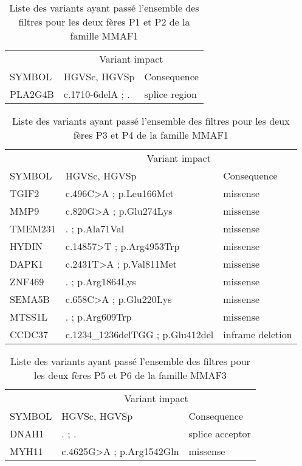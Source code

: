 \documentclass[12pt,twoside]{reedthesis}
\theoremstyle{definition}
\theoremstyle{definition}
\theoremstyle{remark}
\begin{document}
  \begin{longtable}[t]{lll}
  \caption{\label{tab:tabmmaf1}Liste des variants ayant passé l'ensemble des filtres pour les deux fères P1 et P2 de la famille MMAF1}\\
  \toprule
  \multicolumn{1}{c}{ } & \multicolumn{2}{c}{Variant impact} \\
  \cmidrule(l{2pt}r{2pt}){2-3}
  SYMBOL & HGVSc, HGVSp & Consequence\\
  \midrule
  PLA2G4B & c.1710-6delA ; . & splice region\\
  \bottomrule
  \end{longtable}
  
  \begin{longtable}[t]{lll}
  \caption{\label{tab:tabmmaf2}Liste des variants ayant passé l'ensemble des filtres pour les deux fères P3 et P4 de la famille MMAF1}\\
  \toprule
  \multicolumn{1}{c}{ } & \multicolumn{2}{c}{Variant impact} \\
  \cmidrule(l{2pt}r{2pt}){2-3}
  SYMBOL & HGVSc, HGVSp & Consequence\\
  \midrule
  TGIF2 & c.496C>A ; p.Leu166Met & missense\\
  MMP9 & c.820G>A ; p.Glu274Lys & missense\\
  TMEM231 & . ; p.Ala71Val & missense\\
  HYDIN & c.14857>T ; p.Arg4953Trp & missense\\
  DAPK1 & c.2431T>A ; p.Val811Met & missense\\
  \addlinespace
  ZNF469 & . ; p.Arg1864Lys & missense\\
  SEMA5B & c.658C>A ; p.Glu220Lys & missense\\
  MTSS1L & . ; p.Arg609Trp & missense\\
  CCDC37 & c.1234\_1236delTGG ; p.Glu412del & inframe deletion\\
  \bottomrule
  \end{longtable}
  
  \begin{longtable}[t]{lll}
  \caption{\label{tab:tabmmaf3}Liste des variants ayant passé l'ensemble des filtres pour les deux fères P5 et P6 de la famille MMAF3}\\
  \toprule
  \multicolumn{1}{c}{ } & \multicolumn{2}{c}{Variant impact} \\
  \cmidrule(l{2pt}r{2pt}){2-3}
  SYMBOL & HGVSc, HGVSp & Consequence\\
  \midrule
  DNAH1 & . ; . & splice acceptor\\
  MYH11 & c.4625G>A ; p.Arg1542Gln & missense\\
  \bottomrule
  \end{longtable}
  
\end{document}
